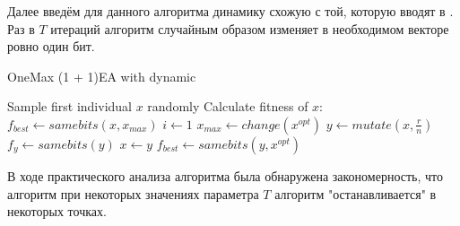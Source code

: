 \documentclass[times,specification,annotation]{itmo-student-thesis}
\begin{document}
    Далее введём для данного алгоритма динамику схожую с той, которую вводят в \cite{optima_1} \cite{optima_2}. Раз в $T$ итераций алгоритм случайным образом изменяет в необходимом векторе ровно один бит.
    \begin{algorithm}
        \caption{OneMax (1 + 1)EA with dynamic}\label{alg:Example2}
        \begin{algorithmic}[1]

            \State Sample first individual $x$ randomly
            \State Calculate fitness of $x$: $f_{best} \leftarrow samebits(x, x_{max})$
            \State $i \leftarrow 1$
                    \State $x_{max} \leftarrow change(x^{opt})$
                \EndIf
                \State $y \leftarrow mutate(x, \frac{r}{n})$
                \State $f_y \leftarrow samebits(y)$
                    \State $x \leftarrow y$
                    \State $f_{best} \leftarrow samebits(y, x^{opt})$
                \EndIf
            \EndWhile

        \end{algorithmic}
    \end{algorithm}

    В ходе практического анализа алгоритма была обнаружена закономерность, что алгоритм при некоторых значениях параметра $T$ алгоритм "останавливается" в некоторых точках.
\end{document}
